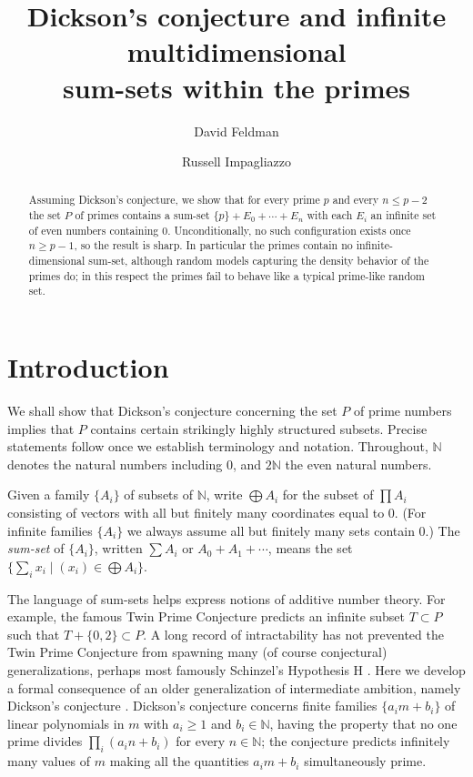 \documentclass[11pt]{amsart}
\title[Dickson's conjecture and sum-sets within the primes]
      {Dickson's conjecture and infinite multidimensional\\ sum-sets within the primes}
\author{David Feldman}
\author{Russell Impagliazzo}
\theoremstyle{remark}
\newcommand{\NN}{\mathbb{N}}
\newcommand{\PP}{P}
\begin{document}
\begin{abstract}
Assuming Dickson's conjecture, we show that for every prime $p$ and
every $n\le p-2$ the set $\PP$ of primes contains a sum-set
$\{p\}+E_0+\cdots+E_n$ with each $E_i$ an infinite set of even numbers
containing $0$.  Unconditionally, no such configuration exists once
$n\ge p-1$, so the result is sharp.  In particular the primes contain
no infinite-dimensional sum-set, although random models capturing the
density behavior of the primes do; in this respect the primes fail to
behave like a typical prime-like random set.
\end{abstract}

\maketitle

\section{Introduction}

We shall show that Dickson's conjecture concerning the set $\PP$ of
prime numbers implies that $\PP$ contains certain strikingly highly
structured subsets.  Precise statements follow once we establish
terminology and notation.  Throughout, $\NN$ denotes the natural
numbers including $0$, and $2\NN$ the even natural numbers.

Given a family $\{A_i\}$ of subsets of $\NN$, write $\bigoplus A_i$
for the subset of $\prod A_i$ consisting of vectors with all but
finitely many coordinates equal to $0$.  (For infinite families
$\{A_i\}$ we always assume all but finitely many sets contain $0$.)
The \emph{sum-set} of $\{A_i\}$, written $\sum A_i$ or
$A_0+A_1+\cdots$, means the set
$\bigl\{\sum_i x_i \mid (x_i)\in\bigoplus A_i\bigr\}$.

The language of sum-sets helps express notions of additive number
theory.  For example, the famous Twin Prime Conjecture predicts an
infinite subset $T\subset\PP$ such that $T+\{0,2\}\subset\PP$.  A long
record of intractability has not prevented the Twin Prime Conjecture
from spawning many (of course conjectural) generalizations, perhaps
most famously Schinzel's Hypothesis H \cite{SchSie}.  Here we develop
a formal consequence of an older generalization of intermediate
ambition, namely Dickson's conjecture \cite{Dickson}.  Dickson's
conjecture concerns finite families $\{a_i m+b_i\}$ of linear
polynomials in $m$ with $a_i\ge 1$ and $b_i\in\NN$,
having the property that no one prime divides $\prod_i(a_i n+b_i)$
for every $n\in\NN$; the conjecture predicts infinitely many values of
$m$ making all the quantities $a_i m+b_i$ simultaneously prime.
\end{document}
